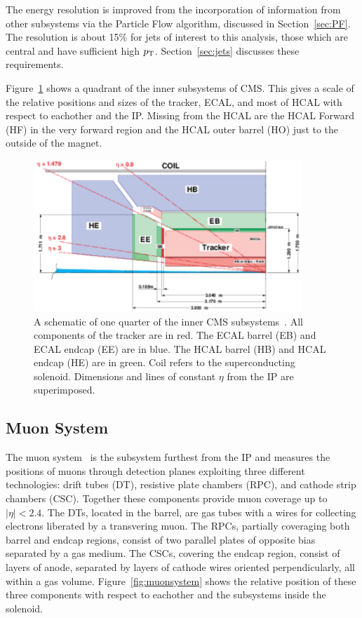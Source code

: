 The energy resolution is improved from the incorporation of information from other subsystems via
the Particle Flow algorithm, discussed in Section~\ref{sec:PF}.
The resolution is about 15\% for jets of interest to this analysis, those which are central and
have sufficient high $p_{\rm T}$. Section~\ref{sec:jets} discusses these requirements.

Figure~\ref{fig:subsystems_inner} shows a quadrant of the inner subsystems of CMS. This gives
a scale of the relative positions and sizes of the tracker, ECAL,
and most of HCAL with respect to eachother and the IP. Missing from the HCAL are the 
HCAL Forward (HF) in the very forward region and the HCAL outer barrel (HO) just to the outside of
the magnet.

\begin{figure}[ht]
 \begin{center}
   \includegraphics[width=0.90\textwidth]{figures/experiment/subsystems_inner.pdf}
      \end{center}
\caption{A schematic of one quarter of the inner CMS subsystems~\cite{ecaltdr}.
All components of the tracker are in red. The ECAL barrel (EB) and ECAL endcap (EE) are in blue.
The HCAL barrel (HB) and HCAL endcap (HE) are in green. Coil refers to the superconducting solenoid.
Dimensions and lines of constant $\eta$ from the IP are superimposed.}
\label{fig:subsystems_inner}
\end{figure}


\subsection{Muon System\label{subsec:muonsystem}}

The muon system~\cite{muontdr} is the subsystem furthest from the IP and measures the positions
of muons through detection planes exploiting three different technologies:
drift tubes (DT), resistive plate chambers (RPC), and cathode strip chambers (CSC).
Together these components provide muon coverage up to $|\eta|< 2.4$.
The DTs, located in the barrel, are gas tubes with a wires for collecting electrons liberated
by a transvering muon. The RPCs, partially coveraging both barrel and endcap regions, consist
of two parallel plates of opposite bias separated by a gas medium. The CSCs, covering the endcap region,
consist of layers of anode, separated by layers of cathode wires oriented perpendicularly, all
within a gas volume. Figure~\ref{fig:muonsystem} shows the relative position of these three components with respect to eachother and the subsystems inside the solenoid.

